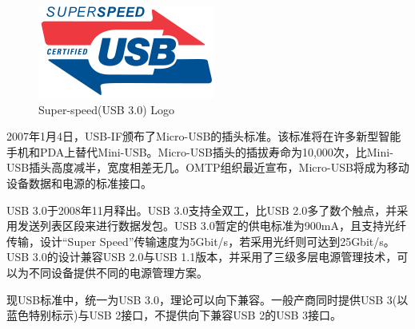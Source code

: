 \begin{figure}[ht]
	\begin{center}
		\includegraphics[keepaspectratio,width=0.5\paperwidth]{Hardwares/usb-super-speed-logo.png}
	\caption{Super-speed(USB 3.0) Logo}
	\label{fig:usb-super-speed-logo}
	\end{center}
\end{figure}


2007年1月4日，USB-IF颁布了Micro-USB的插头标准。该标准将在许多新型智能手机和PDA上替代Mini-USB。Micro-USB插头的插拔寿命为10,000次，比Mini-USB插头高度减半，宽度相差无几。OMTP组织最近宣布，Micro-USB将成为移动设备数据和电源的标准接口。

USB 3.0于2008年11月释出。USB 3.0支持全双工，比USB 2.0多了数个触点，并采用发送列表区段来进行数据发包。USB 3.0暂定的供电标准为900mA，且支持光纤传输，设计“Super Speed”传输速度为5Gbit/s，若采用光纤则可达到25Gbit/s。USB 3.0的设计兼容USB 2.0与USB 1.1版本，并采用了三级多层电源管理技术，可以为不同设备提供不同的电源管理方案。

现USB标准中，统一为USB 3.0，理论可以向下兼容。一般产商同时提供USB 3(以蓝色特别标示)与USB 2接口，不提供向下兼容USB 2的USB 3接口。


